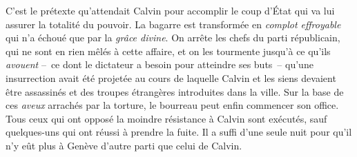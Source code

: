 \documentclass[french,twoside]{book} %
\newcommand{\astermono}{\medskip\centerline{\color{rubric}\large\selectfont{\syms ✻}}\medskip\par}%
\begin{document}
C’est le prétexte qu’attendait Calvin pour accomplir le coup d’État qui va lui assurer la totalité du pouvoir. La bagarre est transformée en \emph{complot effroyable} qui n’a échoué que par la \emph{grâce divine}. On arrête les chefs du parti républicain, qui ne sont en rien mêlés à cette affaire, et on les tourmente jusqu’à ce qu’ils \emph{avouent} – ce dont le dictateur a besoin pour atteindre ses buts – qu’une insurrection avait été projetée au cours de laquelle Calvin et les siens devaient être assassinés et des troupes étrangères introduites dans la ville. Sur la base de ces \emph{aveux} arrachés par la torture, le bourreau peut enfin commencer son office. Tous ceux qui ont opposé la moindre résistance à Calvin sont exécutés, sauf quelques-uns qui ont réussi à prendre la fuite. Il a suffi d’une seule nuit pour qu’il n’y eût plus à Genève d’autre parti que celui de Calvin.\par

\astermono
\end{document}
